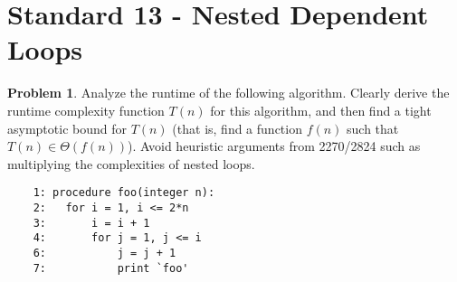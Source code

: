 \documentclass[11pt]{article}
\theoremstyle{definition}
\theoremstyle{definition}
\newtheorem{required}{Problem}
\theoremstyle{definition}
\begin{document}
\newpage
\section{Standard 13 - Nested Dependent Loops}
\begin{required}
Analyze the runtime of the following algorithm. Clearly derive the runtime complexity function $T(n)$ for this algorithm, and then find a tight asymptotic bound for $T(n)$ (that is, find a function $f(n)$ such that $T(n) \in \Theta(f(n))$). Avoid heuristic arguments from 2270/2824 such as multiplying the complexities of nested loops. 

\begin{verbatim}
	1: procedure foo(integer n):
	2:   for i = 1, i <= 2*n
	3:       i = i + 1
	4:       for j = 1, j <= i
	6:           j = j + 1
	7:           print `foo'
\end{verbatim}

\end{required}
\end{document}
